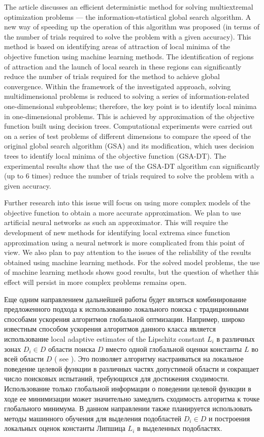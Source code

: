 \documentclass[entropy,article,submit,moreauthors,pdftex]{Definitions/mdpi}
\begin{document}
The article discusses an efficient deterministic method for solving multiextremal optimization problems --- the information-statistical global search algorithm.
A new way of speeding up the operation of this algorithm was proposed (in terms of the number of trials required to solve the problem with a given accuracy). This method is based on identifying areas of attraction of local minima of the objective function using machine learning methods. The identification of regions of attraction and the launch of local search in these regions can significantly reduce the number of trials required for the method to achieve global convergence. 
Within the framework of the investigated approach, solving multidimensional problems is reduced to solving a series of information-related one-dimensional subproblems; therefore, the key point is to identify local minima in one-dimensional problems. This is achieved by approximation of the objective function built using decision trees. 
Computational experiments were carried out on a series of test problems of different dimensions to compare the speed of the original global search algorithm (GSA) and its modification, which uses decision trees to identify local minima of the objective function (GSA-DT). 
The experimental results show that the use of the GSA-DT algorithm can significantly (up to 6 times) reduce the number of trials required to solve the problem with a given accuracy.

Further research into this issue will focus on using more complex models of the objective function to obtain a more accurate approximation. We plan to use artificial neural networks as such an approximator. This will require the development of new methods for identifying local extrema since function approximation using a neural network is more complicated from this point of view. We also plan to pay attention to the issues of the reliability of the results obtained using machine learning methods. For the solved model problems, the use of machine learning methods shows good results, but the question of whether this effect will persist in more complex problems remains open.

Еще одним направлением дальнейшей работы будет являться комбинирование предложенного подхода к использованию локального поиска с традиционными способами ускорения алгоритмов глобальной оптмизации. Например, широко известным способом ускорения алгоритмов данного класса является использование local adaptive estimates of the Lipschitz constant $L_i$ в различных зонах $D_i \in D$ области поиска $D$ вместо одной глобальной оценки константы $L$ во всей области $D$ ( see \cite{Kvasov2020,Sergeyev2021}).
Это позволяет алгоритму настраиваться на локальное поведение целевой функции в различных частях допустимой области и сокращает число поисковых испытаний, требующихся для достижения сходимости. Использование только глобальной информации о поведении целевой функции в ходе ее минимизации может значительно замедлить сходимость алгоритма к точке
глобального минимума. В данном направлении также планируется использовать методы машинного обучения для выделения подобластей $D_i \in D$ и построения локальных оценок константы Липшица $L_i$ в выделенных подобластях. 
\end{document}
